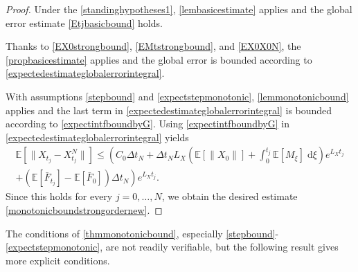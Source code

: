 \documentclass[reqno,12pt]{amsart}
\theoremstyle{plain} %
\theoremstyle{definition} %
\begin{document}
\begin{proof}
    Under the \cref{standinghypotheses1}, \cref{lembasicestimate} applies and the global error estimate \eqref{Etjbasicbound} holds.
    
    Thanks to \eqref{EX0strongbound}, \eqref{EMtstrongbound}, and \eqref{EX0X0N}, the \cref{propbasicestimate} applies and the global error is bounded according to \eqref{expectedestimateglobalerrorintegral}.
    
    With assumptions \eqref{stepbound} and \eqref{expectstepmonotonic}, \cref{lemmonotonicbound} applies and the last term in \eqref{expectedestimateglobalerrorintegral} is bounded according to \eqref{expectintfboundbyG}. Using \eqref{expectintfboundbyG} in \eqref{expectedestimateglobalerrorintegral} yields
    \begin{multline*}
        \mathbb{E} \left[\|X_{t_j} - X_{t_j}^N\|\right] \leq \left( C_0 \Delta t_N + \Delta t_N L_X \left(\mathbb{E}[\|X_0\|] + \int_0^{t_j} \mathbb{E}[M_\xi]\;\mathrm{d}\xi\right)e^{L_X t_j}\right. \\
        \left. + (\mathbb{E}[\bar F_{t_j}] - \mathbb{E}[\bar F_0])\Delta t_N\right) e^{L_X t_j}.
    \end{multline*}
    Since this holds for every $j=0, \ldots, N$, we obtain the desired estimate \eqref{monotonicboundstrongordernew}.
\end{proof}

The conditions of \cref{thmmonotonicbound}, especially \eqref{stepbound}-\eqref{expectstepmonotonic}, are not readily verifiable, but the following result gives more explicit conditions.
\end{document}
